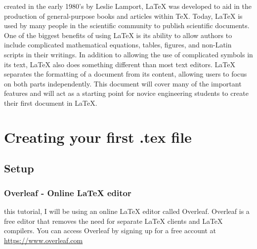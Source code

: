 \documentclass[12pt,journal,compsoc]{IEEEtran}
\begin{document}
 created in the early 1980's by Leslie Lamport, LaTeX was developed to aid in the production of general-purpose books and articles within TeX. Today, LaTeX is used by many people in the scientific community to publish scientific documents. One of the biggest benefits of using LaTeX is its ability to allow authors to include complicated mathematical equations, tables, figures, and non-Latin scripts in their writings. In addition to allowing the use of complicated symbols in its text, LaTeX also does something different than most text editors. LaTeX separates the formatting of a document from its content, allowing users to focus on both parts independently. This document will cover many of the important features and will act as a starting point for novice engineering students to create their first document in LaTeX. \cite{Wikipedia:Overview}
 








\section{Creating your first .tex file}

\subsection{Setup}
\subsubsection{Overleaf - Online LaTeX editor}
 this tutorial, I will be using an online LaTeX editor called Overleaf. Overleaf is a free editor that removes the need for separate LaTeX clients and LaTeX compilers. You can access Overleaf by signing up for a free account at \url{https://www.overleaf.com}
\end{document}
